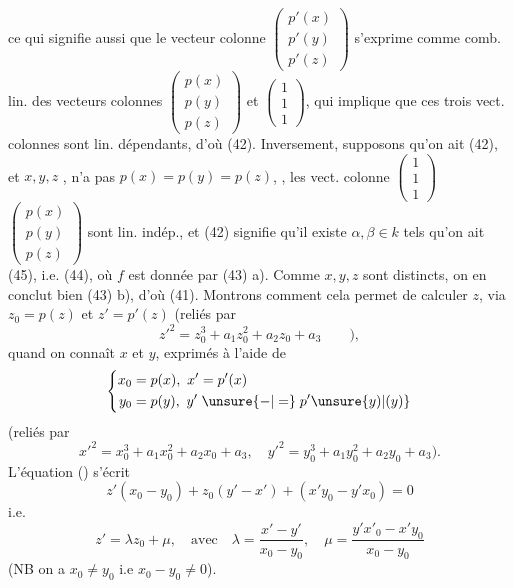 ce qui signifie aussi que le vecteur colonne $\begin{pmatrix}p'(x)\\p'(y)\\p'(z)\end{pmatrix}$ s'exprime comme comb. lin. des vecteurs colonnes $\begin{pmatrix}p(x)\\p(y)\\p(z)\end{pmatrix}$ et $\begin{pmatrix}1\\1\\1\end{pmatrix}$,  qui implique que ces trois vect. colonnes sont lin. dépendants, d'où (42). Inversement, supposons qu'on ait (42), et $x,y,z$  ,    n'a pas $p(x)=p(y)=p(z)$,  ,    les vect. colonne $\begin{pmatrix}1\\1\\1\end{pmatrix}$ $\begin{pmatrix}p(x)\\p(y)\\p(z)\end{pmatrix}$ sont lin. indép., et (42) signifie qu'il existe $\alpha,\beta\in k$ tels qu'on ait (45), i.e. (44), où $f$ est donnée par (43) a). Comme $x,y,z$ sont distincts, on en conclut bien (43) b), d'où (41).
Montrons comment cela permet de calculer $z$, via $z_0=p(z)$ et $z'=p'(z)$ (reliés par
\[
 {z'}^2=z_0^3+a_1z_0^2+a_2z_0+a_3\qquad), \tag*{(46)}
\]
quand on connaît $x$ et $y$, exprimés à l'aide de 
\[
 \left\{\begin{aligned}
 x_0&=p(x),\ x'=p'(x)\\
 y_0&=p(y),\ y'\mathrel{\unsure{-|=}}p'\unsure{y)|(y)}
 \end{aligned}\right.
\]
(reliés par
\[
 {x'}^2=x_0^3+a_1x_0^2+a_2x_0+a_3,\quad
 {y'}^2=y_0^3+a_1y_0^2+a_2y_0+a_3).
\]
L'équation () s'écrit
\[
 z'(x_0-y_0)+z_0(y'-x')+(x'y_0-y'x_0)=0 \tag*{$(*)$}
\]
i.e.
\[
 z'=\lambda z_0+\mu,\quad\text{avec}\quad
 \lambda=\frac{x'-y'}{x_0-y_0},\quad
 \mu=\frac{y'x'_0-x'y_0}{x_0-y_0} \tag*{(47)}
\]
 (NB on a $x_0\ne y_0$ i.e $x_0-y_0\ne0$).


